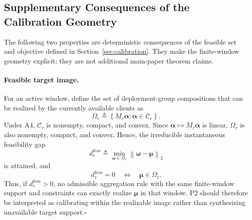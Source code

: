 \subsection{Supplementary Consequences of the Calibration Geometry}
\label{app:supp_calibration_geometry}

The following two properties are deterministic consequences of the feasible
set and objective defined in Section~\ref{sec:calibration}.  They make the
finite-window geometry explicit; they are not additional main-paper theorem
claims.

\paragraph{Feasible target image.}
For an active window, define the set of deployment-group compositions that can
be realized by the currently available clients as
\begin{equation}
 \Omega_r
 \triangleq
 \left\{
 M_r\boldsymbol\alpha:
 \boldsymbol\alpha\in\mathcal C_r
 \right\}.
 \label{eq:app_feasible_target_image}
\end{equation}
Under A4, $\mathcal C_r$ is nonempty, compact, and convex.  Since
$\boldsymbol\alpha\mapsto M_r\boldsymbol\alpha$ is linear, $\Omega_r$ is also
nonempty, compact, and convex.  Hence, the irreducible instantaneous
feasibility gap
\begin{equation}
 d_r^{\mathrm{feas}}
 \triangleq
 \min_{\boldsymbol\omega\in\Omega_r}
 \left\|
 \boldsymbol\omega-\boldsymbol\mu
 \right\|_2
 \label{eq:app_feasibility_gap}
\end{equation}
is attained, and
\begin{equation}
 d_r^{\mathrm{feas}}=0
 \quad\Longleftrightarrow\quad
 \boldsymbol\mu\in\Omega_r.
 \label{eq:app_exact_realizability}
\end{equation}
Thus, if $d_r^{\mathrm{feas}}>0$, no admissible aggregation rule with the same
finite-window support and constraints can exactly realize
$\boldsymbol\mu$ in that window.  P2 should therefore be interpreted as
calibrating within the realizable image rather than synthesizing unavailable
target support.\hfill$\square$

